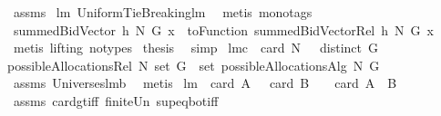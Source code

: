 \begin{isabellebody}
\ assms\ \isanewline
lm{}{}\ UniformTieBreaking{\isachardot}lm{}{}\ \isamarkupfalse%
\ {\isacharparenleft}metis\ {\isacharparenleft}mono{\isacharunderscore}tags{\isacharparenright}{\isacharparenright}\isanewline
{}\isamarkupfalse%
\ \isamarkupfalse%
\ {\isachardoublequoteopen}summedBidVector\ {\isacharquery}h{}\ N\ G\ x\ {\isacharequal}\ {\isacharparenleft}toFunction\ {\isacharparenleft}summedBidVectorRel\ {\isacharquery}h{}\ N\ G{\isacharparenright}{\isacharparenright}\ x{\isachardoublequoteclose}\ \isanewline
{}\isamarkupfalse%
\ {\isacharparenleft}metis\ {\isacharparenleft}lifting{\isacharcomma}\ no{\isacharunderscore}types{\isacharparenright}{\isacharparenright}\isanewline
{}\isamarkupfalse%
\ {\isacharquery}thesis\ \isamarkupfalse%
\ simp\isanewline
{}\isamarkupfalse%
%
\endisatagproof
{\isafoldproof}%
%
\isadelimproof
\isanewline
%
\endisadelimproof
\isanewline
{}\isamarkupfalse%
\ lm{}{}c{\isacharcolon}\ \ {\isachardoublequoteopen}card\ N\ {\isachargreater}\ {}{\isachardoublequoteclose}\ {\isachardoublequoteopen}distinct\ G{\isachardoublequoteclose}\ \ \isanewline
{\isachardoublequoteopen}possibleAllocationsRel\ N\ {\isacharparenleft}set\ G{\isacharparenright}\ {\isacharequal}\ set\ {\isacharparenleft}possibleAllocationsAlg\ N\ G{\isacharparenright}{\isachardoublequoteclose}\ \ \isanewline
%
\isadelimproof
%
\endisadelimproof
%
\isatagproof
{}\isamarkupfalse%
\ assms\ Universes{\isachardot}lm{}{}b\ \isamarkupfalse%
\ metis%
\endisatagproof
{\isafoldproof}%
%
\isadelimproof
\isanewline
%
\endisadelimproof
\isanewline
{}\isamarkupfalse%
\ lm{}{}{\isacharcolon}\ \ {\isachardoublequoteopen}card\ A\ {\isachargreater}\ {}{\isachardoublequoteclose}\ {\isachardoublequoteopen}card\ B\ {\isachargreater}\ {}{\isachardoublequoteclose}\ \ {\isachardoublequoteopen}card\ {\isacharparenleft}A\ {\isasymunion}\ B{\isacharparenright}\ {\isachargreater}\ {}{\isachardoublequoteclose}\ \isanewline
%
\isadelimproof
%
\endisadelimproof
%
\isatagproof
{}\isamarkupfalse%
\ assms\ card{\isacharunderscore}gt{\isacharunderscore}{}{\isacharunderscore}iff\ finite{\isacharunderscore}Un\ sup{\isacharunderscore}eq{\isacharunderscore}bot{\isacharunderscore}iff\ \isamarkupfalse%

\end{isabellebody}
